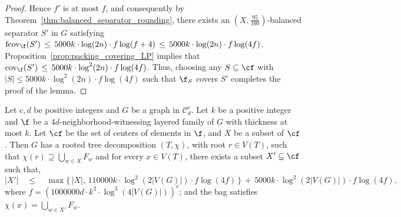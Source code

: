 \begin{proof}
    Hence $f'$ is at most $f$, and consequently by Theorem~\ref{thm:balanced_separator_rounding}, there exists an $(X,\frac{95}{100})$-balanced separator $S'$ in $G$ satisfying $\mathrm{fcov}_{\f}(S')\, \leq\, 5000k\cdot \log(2n)\cdot f\log(f+4)\, \leq\, 5000k\cdot \log(2n)\cdot f\log (4f)$. Proposition~\ref{prop:packing_covering_LP} implies that $\mathrm{cov}_{\f}(S')\, \leq\, 5000k\cdot \log^2(2n)\cdot f\log (4f)$. 
    Thus, choosing any $S \subseteq \cf$ with $|S| \leq 5000k \cdot \log^2(2n) \cdot f \log (4f)$ such that $\f_S$ covers $S'$ completes the proof of the lemma.
\end{proof}


\begin{theorem}\label{thm:F_treewidth}
    Let $c,d$ be positive integers and $G$ be a graph in $\mathcal{C}^c_d$. Let $k$ be a positive integer and $\f$ be a $4d$-neighborhood-witnessing layered family of $G$ with thickness at most $k$. Let $\cf$ be the set of centers of elements in $\f$, and $X$ be a subset of $\cf$. Then $G$ has a rooted tree decomposition $(T,\chi)$, with root $r\in V(T)$, such that $\chi(r) \supseteq \bigcup_{w \in X} F_w$ and for every $x\in V(T)$, there exists a subset $X'\subseteq \cf$ such that,
    $$
    |X'| \quad
    \leq \quad \max\{\,|X|,\, 110000k\cdot \log^2 (2|V(G)|)\cdot f\log (4f)\,\}\, +\, 5000k\cdot \log^2 (2|V(G)|)\cdot f\log (4f),
    $$
    where $f = (1000000d\cdot k^2\cdot \log^3 (4|V(G)|))^{c}$; and the bag satisfies $\chi(x) = \bigcup_{w \in X'} F_w$.
\end{theorem}
